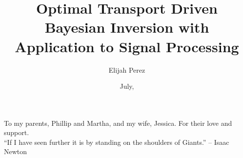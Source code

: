\documentclass[botnum, fleqn]{unmeethesis}
\begin{document}
\frontmatter





\title{Optimal Transport Driven Bayesian Inversion with Application to Signal Processing}

\author{Elijah Perez}





\date{July, \thisyear}

\maketitle


\begin{dedication}
   To my parents, Phillip and Martha, and my wife, Jessica. For their love and support. \\[3ex]
   ``If I have seen further it is by standing on the shoulders of Giants.''
         -- Isaac Newton
\end{dedication}


\maketitleabstract %
\end{document}
